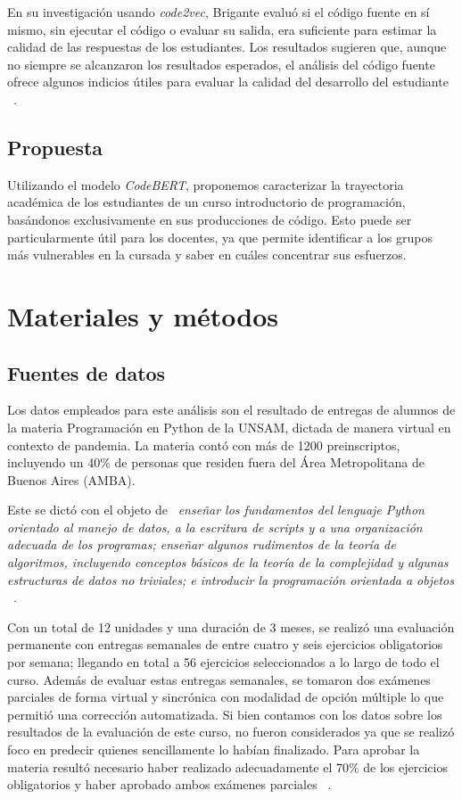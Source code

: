 \documentclass[11pt,a4paper,twoside,openany]{tesis}
\begin{document}
En su investigación usando \emph{code2vec},  Brigante  evaluó si el código fuente en sí mismo, sin ejecutar el código o evaluar su salida, era suficiente para estimar la calidad de las respuestas de los estudiantes. Los resultados sugieren que, aunque no siempre se alcanzaron los resultados esperados, el análisis del código fuente ofrece algunos indicios útiles para evaluar la calidad del desarrollo del estudiante ~\cite{brigante2020evaluation}.

\section{Propuesta}

Utilizando el modelo \emph{CodeBERT}, proponemos caracterizar la trayectoria académica de los estudiantes de un curso introductorio de programación, basándonos exclusivamente en sus producciones de código. Esto puede ser particularmente útil para los docentes, ya que permite identificar a los grupos más vulnerables en la cursada y saber en cuáles concentrar sus esfuerzos.

\chapter{Materiales y métodos}
\section{Fuentes de datos}
Los datos empleados para este análisis son el resultado de entregas de alumnos de la materia Programación en Python de la UNSAM, dictada de manera virtual en contexto de pandemia.  La materia contó con más de 1200 preinscriptos, incluyendo  un  40\%  de  personas  que  residen  fuera  del  Área  Metropolitana de Buenos Aires (AMBA).

Este se dictó con el objeto de ~\emph{enseñar los fundamentos del lenguaje Python orientado al manejo de datos, a la escritura de scripts y a una organización adecuada de los programas; enseñar  algunos  rudimentos  de  la  teoría  de  algoritmos,  incluyendo  conceptos  básicos  de  la teoría de la complejidad y algunas estructuras de datos no triviales; e introducir la programación orientada a objetos} ~\cite{unsam2020}.

Con un total de 12 unidades y una duración de 3 meses, se realizó una evaluación permanente con entregas semanales de entre cuatro y seis ejercicios obligatorios por semana; llegando en total a  56  ejercicios  seleccionados  a  lo  largo  de  todo  el  curso.  Además  de  evaluar  estas  entregas semanales, se tomaron dos exámenes parciales de forma virtual y sincrónica con modalidad de opción múltiple lo que permitió una corrección automatizada. Si bien contamos con los datos sobre los resultados de la evaluación de este curso, no fueron considerados ya que se realizó foco en predecir quienes sencillamente lo habían finalizado. Para aprobar la materia resultó necesario haber realizado adecuadamente el 70\% de los  ejercicios  obligatorios  y  haber  aprobado  ambos  exámenes  parciales ~\cite{unsam2020}.
\end{document}
